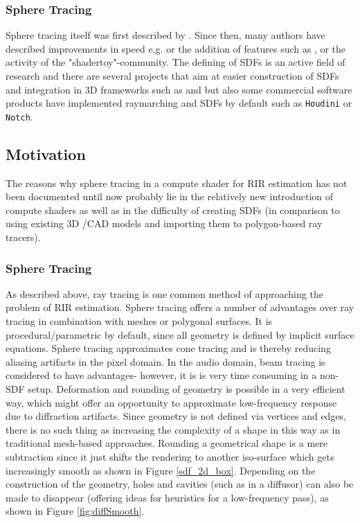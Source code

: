 \documentclass[twoside,a4paper]{article}
\begin{document}
\subsubsection*{Sphere Tracing}
Sphere tracing itself was first described by \cite{hart_sphere_1996}. Since then, many authors have described improvements in speed e.g. \cite{balint_accelerating_2018} or the addition of features such as \cite{quilez_inigo_nodate} \cite{sawhney_monte_2020}, \cite{keinert_enhanced_2014} or the activity of the "shadertoy"-community\cite{quilez_shadertoy_nodate}.
The defining of SDFs is an active field of research and there are several projects that aim at easier construction of SDFs and integration in 3D frameworks such as \cite{SDFunity}  and \cite{lechner_hrtlacektdraymarchtoolkit_2020} but 
also some commercial software products have implemented raymarching and SDFs by default such as \texttt{Houdini} or \texttt{Notch}.



\subsection{Motivation}
\label{subs:mot}
The reasons why sphere tracing in a compute shader for RIR estimation has not been documented until now probably lie in the relatively new introduction of compute shaders as well as in the difficulty of creating SDFs (in comparison to using existing 3D /CAD models and importing them to polygon-based ray tracers).
\subsubsection{Sphere Tracing}
As described above, ray tracing is one common method of approaching the problem of RIR estimation. Sphere tracing offers a number of advantages over ray tracing in combination with meshes or polygonal surfaces. It is procedural/parametric by default, since all geometry is defined by implicit surface equations. Sphere tracing approximates cone tracing and is thereby reducing aliasing artifacts in the pixel domain\cite{hart_sphere_1996}. In the audio domain, beam tracing is considered to have advantages- however, it is is very time consuming in a non-SDF setup\cite{alpkocak_computing_2010}. Deformation and rounding of geometry is possible in a very efficient way, which might offer an opportunity to approximate low-frequency response due to diffraction artifacts. Since geometry is not defined via vertices and edges, there is no such thing as increasing the complexity of a shape in this way as in traditional mesh-based approaches. Rounding a geometrical shape is a mere subtraction since it just shifts the rendering to another iso-surface which gets increasingly smooth as shown in Figure \ref{sdf_2d_box}. Depending on the construction of the geometry, holes and cavities (such as in a diffusor) can also be made to disappear (offering ideas for heuristics for a low-frequency pass), as shown in Figure \ref{fig:diffSmooth}.
\end{document}

